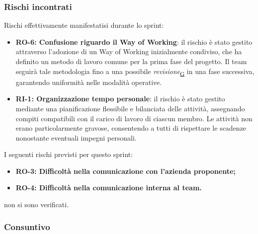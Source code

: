 \documentclass[a4paper,12pt]{article}
\newlength{\namecol}
\begin{document}
{        \subsubsection{Rischi incontrati}{
            Rischi effettivamente manifestatisi durante lo sprint:
            \begin{itemize}
                \item \textbf{RO-6: Confusione riguardo il Way of Working}: il rischio è stato gestito attraverso l'adozione di un Way of Working inizialmente condiviso, che ha definito un metodo di lavoro comune per la prima fase del progetto. Il team seguirà tale metodologia fino a una possibile \textit{revisione}\textsubscript{\href{https://atlasteam9.github.io/Atlas/glossario.html\#Revisione}{G}} in una fase successiva, garantendo uniformità nelle modalità operative.
                \item \textbf{RI-1: Organizzazione tempo personale}: il rischio è stato gestito mediante una pianificazione flessibile e bilanciata delle attività, assegnando compiti compatibili con il carico di lavoro di ciascun membro. Le attività non erano particolarmente gravose, consentendo a tutti di rispettare le scadenze nonostante eventuali impegni personali.
            \end{itemize}
            I seguenti rischi previsti per questo sprint:
            \begin{itemize}
                \item \textbf{RO-3: Difficoltà nella comunicazione con l'azienda proponente;}
                \item \textbf{RO-4: Difficoltà nella comunicazione interna al team.}
            \end{itemize}
            non si sono verificati.
        }

        \subsubsection{Consuntivo}{
            \begin{table}[H]
                \centering
                \hspace*{-14cm}%


\end{table}}}
\end{document}
